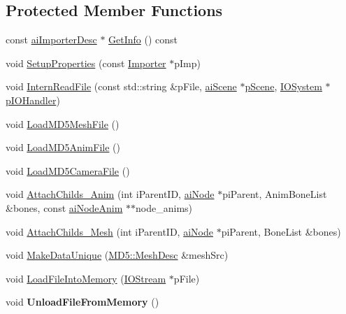 \subsection*{Protected Member Functions}
\begin{DoxyCompactItemize}
\item 
const \hyperlink{structai_importer_desc}{ai\+Importer\+Desc} $\ast$ \hyperlink{class_assimp_1_1_m_d5_importer_ac268fc50f92b69c5b80f07b553a42015}{Get\+Info} () const 
\item 
void \hyperlink{class_assimp_1_1_m_d5_importer_a53497bd13f6c050fb668554c8b4faa02}{Setup\+Properties} (const \hyperlink{class_assimp_1_1_importer}{Importer} $\ast$p\+Imp)
\item 
void \hyperlink{class_assimp_1_1_m_d5_importer_a5debfce7091733686d31a2454553736a}{Intern\+Read\+File} (const std\+::string \&p\+File, \hyperlink{structai_scene}{ai\+Scene} $\ast$\hyperlink{class_assimp_1_1_m_d5_importer_a0b840bcb30b376c7cb45557dcc84d3b0}{p\+Scene}, \hyperlink{class_assimp_1_1_i_o_system}{I\+O\+System} $\ast$\hyperlink{class_assimp_1_1_m_d5_importer_ad47907df2a104a4130b56b728ccec5ab}{p\+I\+O\+Handler})
\item 
void \hyperlink{class_assimp_1_1_m_d5_importer_ae152fda3f4163291fc995bedf39968f5}{Load\+M\+D5\+Mesh\+File} ()
\item 
void \hyperlink{class_assimp_1_1_m_d5_importer_ae55c5c829fe67ec3cad1db564aa3f094}{Load\+M\+D5\+Anim\+File} ()
\item 
void \hyperlink{class_assimp_1_1_m_d5_importer_ab20e749ae30d80c5371d44822531d050}{Load\+M\+D5\+Camera\+File} ()
\item 
void \hyperlink{class_assimp_1_1_m_d5_importer_aafd7c0b9500e843ccbd4051e72117d22}{Attach\+Childs\+\_\+\+Anim} (int i\+Parent\+I\+D, \hyperlink{structai_node}{ai\+Node} $\ast$pi\+Parent, Anim\+Bone\+List \&bones, const \hyperlink{structai_node_anim}{ai\+Node\+Anim} $\ast$$\ast$node\+\_\+anims)
\item 
void \hyperlink{class_assimp_1_1_m_d5_importer_aeaa34e39f4cbc3d3b5ff760aa62a9136}{Attach\+Childs\+\_\+\+Mesh} (int i\+Parent\+I\+D, \hyperlink{structai_node}{ai\+Node} $\ast$pi\+Parent, Bone\+List \&bones)
\item 
void \hyperlink{class_assimp_1_1_m_d5_importer_a8b24c9c60b2cd9285d78d9445f37a01d}{Make\+Data\+Unique} (\hyperlink{struct_assimp_1_1_m_d5_1_1_mesh_desc}{M\+D5\+::\+Mesh\+Desc} \&mesh\+Src)
\item 
void \hyperlink{class_assimp_1_1_m_d5_importer_af158d9c4c85c4227378bbaf6e6073463}{Load\+File\+Into\+Memory} (\hyperlink{class_assimp_1_1_i_o_stream}{I\+O\+Stream} $\ast$p\+File)
\item 
\hypertarget{class_assimp_1_1_m_d5_importer_a3dee4113f12b9ffc498c327f028d1c8b}{void {\bfseries Unload\+File\+From\+Memory} ()}\label{class_assimp_1_1_m_d5_importer_a3dee4113f12b9ffc498c327f028d1c8b}

\end{DoxyCompactItemize}
